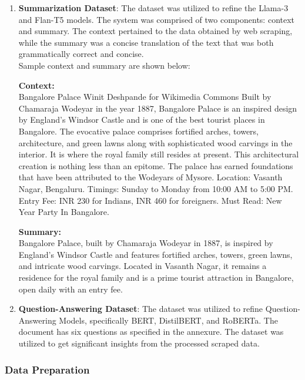 \documentclass[conference]{IEEEtran}
\begin{document}
\begin{enumerate}
    \item \textbf{Summarization Dataset}: The dataset was utilized to refine the Llama-3 and Flan-T5 models. The system was comprised of two components: context and summary. The context pertained to the data obtained by web scraping, while the summary was a concise translation of the text that was both grammatically correct and concise.\\

    Sample context and summary are shown below:

    \begin{mdframed}[linewidth=1pt, innerleftmargin=15pt, innerrightmargin=15pt, innertopmargin=15pt, innerbottommargin=15pt]
    \textbf{Context:} \\
    Bangalore Palace Winit Deshpande for Wikimedia Commons Built by Chamaraja Wodeyar in the year 1887, Bangalore Palace is an inspired design by England's Windsor Castle and is one of the best tourist places in Bangalore. The evocative palace comprises fortified arches, towers, architecture, and green lawns along with sophisticated wood carvings in the interior. It is where the royal family still resides at present. This architectural creation is nothing less than an epitome. The palace has earned foundations that have been attributed to the Wodeyars of Mysore. Location: Vasanth Nagar, Bengaluru. Timings: Sunday to Monday from 10:00 AM to 5:00 PM. Entry Fee: INR 230 for Indians, INR 460 for foreigners. Must Read: New Year Party In Bangalore.

    \textbf{Summary:} \\
    Bangalore Palace, built by Chamaraja Wodeyar in 1887, is inspired by England's Windsor Castle and features fortified arches, towers, green lawns, and intricate wood carvings. Located in Vasanth Nagar, it remains a residence for the royal family and is a prime tourist attraction in Bangalore, open daily with an entry fee.
    \end{mdframed}

    \item \textbf{Question-Answering Dataset}: The dataset was utilized to refine Question-Answering Models, specifically BERT, DistilBERT, and RoBERTa. The document has six questions as specified in the annexure. The dataset was utilized to get significant insights from the processed scraped data.
\end{enumerate}

\subsubsection{Data Preparation}
\end{document}
